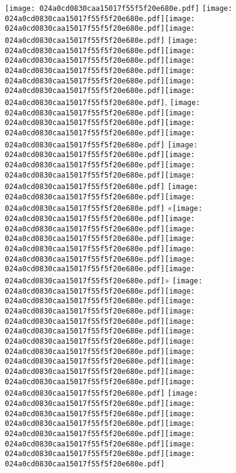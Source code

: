 \documentclass{article}
\newcommand{\origpg}[2]{\texttt{[image: 024a0cd0830caa15017f55f5f20e680e.pdf]}}
\begin{document}
{\vspace{7.612pt}\hspace{35.438pt}\origpg5{120.74pt 168.44pt 131.51pt 184.58pt} \origpg5{135.65pt 168.44pt 142.71pt 184.58pt}\hspace{-0.307pt}\origpg5{142.4pt 168.44pt 150.47pt 184.58pt}\hspace{-0.355pt}\origpg5{150.12pt 168.44pt 160.33pt 184.58pt} \origpg5{164.32pt 168.44pt 171.49pt 184.58pt}\origpg5{171.53pt 168.44pt 179.59pt 184.58pt}\origpg5{179.49pt 168.44pt 187.56pt 184.58pt}\hspace{-0.355pt}\origpg5{187.21pt 168.44pt 195.33pt 184.58pt}\origpg5{195.37pt 168.44pt 202.54pt 184.58pt}\origpg5{202.59pt 168.44pt 209.75pt 184.58pt}\hspace{-0.178pt}, \origpg5{217.74pt 168.44pt 224.91pt 184.58pt}\hspace{0.291pt}\origpg5{225.2pt 168.44pt 232.37pt 184.58pt}\origpg5{232.42pt 168.44pt 240.47pt 184.58pt}\origpg5{240.37pt 168.44pt 249.01pt 184.58pt} \origpg5{253.12pt 168.44pt 261.19pt 184.58pt}\hspace{-0.597pt}\origpg5{260.6pt 168.44pt 268.81pt 184.58pt}\origpg5{268.81pt 168.44pt 277.45pt 184.58pt}\origpg5{277.45pt 168.44pt 286.08pt 184.58pt} \origpg5{289.97pt 168.44pt 298.61pt 184.58pt}\origpg5{298.61pt 168.44pt 304.98pt 184.58pt} «\hspace{-0.361pt}\origpg5{316.9pt 168.44pt 324.75pt 184.58pt}\hspace{-0.129pt}\origpg5{324.62pt 168.44pt 331.79pt 184.58pt}\origpg5{331.83pt 168.44pt 340.47pt 184.58pt}\hspace{-0.21pt}\origpg5{340.26pt 168.44pt 347.43pt 184.58pt}\hspace{0.291pt}\origpg5{347.72pt 168.44pt 355.77pt 184.58pt}\origpg5{355.67pt 168.44pt 363.74pt 184.58pt}\hspace{-0.113pt}\origpg5{363.63pt 168.44pt 371.25pt 184.58pt}\hspace{0.119pt}» \origpg5{383.17pt 168.44pt 391.24pt 184.58pt}\origpg5{391.34pt 168.44pt 398.5pt 184.58pt}\origpg5{398.55pt 168.44pt 405.72pt 184.58pt}\hspace{-0.178pt}\origpg5{405.54pt 168.44pt 412.71pt 184.58pt}\hspace{0.29pt}\origpg5{413pt 168.44pt 420.17pt 184.58pt}\hspace{-0.178pt}\origpg5{419.99pt 168.44pt 428.62pt 184.58pt}\origpg5{428.62pt 168.44pt 436.24pt 184.58pt}\hspace{-0.113pt}\origpg5{436.13pt 168.44pt 443.29pt 184.58pt}\hspace{-0.178pt}\origpg5{443.12pt 168.44pt 451.75pt 184.58pt}\origpg5{451.75pt 168.44pt 460.39pt 184.58pt}\origpg5{460.45pt 168.44pt 467.88pt 184.58pt} \origpg5{471.77pt 168.44pt 479.88pt 184.58pt}\origpg5{479.93pt 168.44pt 487.1pt 184.58pt}\hspace{-0.178pt}\origpg5{486.92pt 168.44pt 494.09pt 184.58pt}\origpg5{494.14pt 168.44pt 501.19pt 184.58pt}\origpg5{501.12pt 168.44pt 509.76pt 184.58pt}\origpg5{509.76pt 168.44pt 518.39pt 184.58pt}\hspace{-0.161pt}\origpg5{518.23pt 168.44pt 529.08pt 184.58pt} 

}
\end{document}
